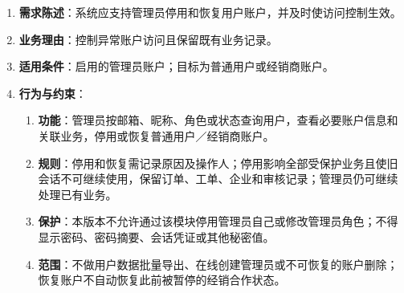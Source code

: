 \begin{enumerate}
\item {\bfseries 需求陈述}：系统应支持管理员停用和恢复用户账户，并及时使访问控制生效。
\item {\bfseries 业务理由}：控制异常账户访问且保留既有业务记录。
\item {\bfseries 适用条件}：启用的管理员账户；目标为普通用户或经销商账户。
\item {\bfseries 行为与约束}：
\begin{enumerate}
\item {\bfseries 功能}：管理员按邮箱、昵称、角色或状态查询用户，查看必要账户信息和关联业务，停用或恢复普通用户／经销商账户。
\item {\bfseries 规则}：停用和恢复需记录原因及操作人；停用影响全部受保护业务且使旧会话不可继续使用，保留订单、工单、企业和审核记录；管理员仍可继续处理已有业务。
\item {\bfseries 保护}：本版本不允许通过该模块停用管理员自己或修改管理员角色；不得显示密码、密码摘要、会话凭证或其他秘密值。
\item {\bfseries 范围}：不做用户数据批量导出、在线创建管理员或不可恢复的账户删除；恢复账户不自动恢复此前被暂停的经销合作状态。
\end{enumerate}

\end{enumerate}


